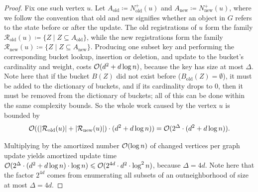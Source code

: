 \begin{proof}
Fix one such vertex $u$.
Let $A_{\mathrm{old}}\coloneqq N^+_{\mathrm{old}}(u)$ and $A_{\mathrm{new}}\coloneqq N^+_{\mathrm{new}}(u)$, where we follow the convention that $\mathrm{old}$ and $\mathrm{new}$ signifies whether an object in $G$ refers to the state before or after the update.
The old registrations of $u$ form the family $\mathcal{R}_{\mathrm{old}}(u)\coloneqq \{Z\mid Z\subseteq A_{\mathrm{old}}\}$, while the new registrations form the family  $\mathcal{R}_{\mathrm{new}}(u)\coloneqq \{Z\mid Z\subseteq A_{\mathrm{new}}\}$.
Producing one subset key and performing the corresponding bucket lookup, insertion or deletion, and update to the bucket's cardinality and weight, costs $\mathcal{O}(d^2 + d\log n)$, because the key has size at most $\Delta$. Note here that if the bucket $B(Z)$ did not exist before ($B_{\textrm{old}}(Z)=\emptyset$), it must be added to the dictionary of buckets, and if its cardinality drops to $0$, then it must be removed from the dictionary of buckets; all of this can be done within the same complexity bounds.
So the whole work caused by the vertex $u$ is bounded by \[\mathcal{O}((|\mathcal{R}_{\mathrm{old}}(u)|+|\mathcal{R}_{\mathrm{new}}(u)|)\cdot (d^2+d\log n))=\mathcal{O}(2^\Delta\cdot (d^2+d\log n)).\]

Multiplying by the amortized number $\mathcal{O}(\log n)$ of changed vertices per graph update yields amortized update time $\mathcal{O}(2^\Delta\cdot (d^2+d\log n)\cdot \log n)\leqslant \mathcal{O}(2^{4d}\cdot d^2\cdot \log^2 n)$, because $\Delta=4d$.
Note here that the factor $2^{4d}$ comes from enumerating all subsets of an outneighborhood of size at most $\Delta=4d$.


\end{proof}
